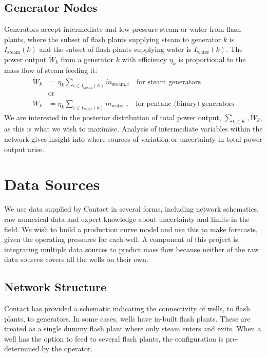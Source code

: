 \documentclass[a4paper, 12pt]{article}
\begin{document}
\subsection{Generator Nodes}
Generators accept intermediate and low pressure steam or water from flash plants, where the subset of flash plants supplying steam to generator $k$ is $I_{\text{steam}}(k)$ and the subset of flash plants supplying water is $I_{\text{water}}(k)$. The power output $\dot{W}_k$ from a generator $k$ with efficiency $\eta_k$ is proportional to the mass flow of steam feeding it:
\begin{align}
\dot{W}_k &= \eta_k \sum_{i\in I_{\text{steam}}(k)} \dot{m}_{\text{steam},i}\quad\text{for steam generators}\\
&\text{or}\nonumber\\
\dot{W}_k &= \eta_k \sum_{i\in I_{\text{water}}(k)} \dot{m}_{\text{water},i}\quad\text{for pentane (binary) generators} \label{eq:power}
\end{align}
We are interested in the posterior distribution of total power output, $\sum_{k\in K}, \dot{W}_k$, as this is what we wish to maximise. Analysis of intermediate variables within the network gives insight into where sources of variation or uncertainty in total power output arise.

\section{Data Sources}
We use data supplied by Contact in several forms, including network schematics, raw numerical data and expert knowledge about uncertainty and limits in the field. We wish to build a production curve model and use this to make forecasts, given the operating pressures for each well. A component of this project is integrating multiple data sources to predict mass flow because neither of the raw data sources covers all the wells on their own.

\subsection{Network Structure}
Contact has provided a schematic indicating the connectivity of wells, to flash plants, to generators. In some cases, wells have in-built flash plants. These are treated as a single dummy flash plant where only steam enters and exits. When a well has the option to feed to several flash plants, the configuration is pre-determined by the operator.
\end{document}
